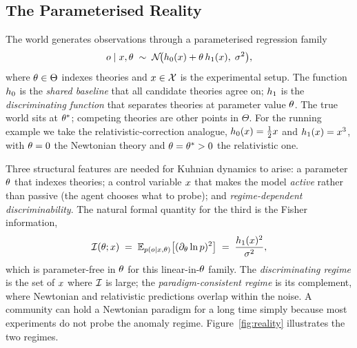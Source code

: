 \subsection{The Parameterised Reality}
\label{ssec:reality}

The world generates observations through a parameterised regression
family
\begin{equation}
o \mid x, \theta
\;\sim\;
\mathcal{N}\!\bigl(h_{0}(x) + \theta\,h_{1}(x),\; \sigma^{2}\bigr),
\label{eq:world}
\end{equation}
where $\theta \in \Theta$ indexes theories and $x \in \mathcal{X}$
is the experimental setup. The function $h_{0}$ is the \emph{shared
baseline} that all candidate theories agree on; $h_{1}$ is the
\emph{discriminating function} that separates theories at parameter
value $\theta$. The true world sits at $\theta^{*}$; competing
theories are other points in $\Theta$. For the running example we take
the relativistic-correction analogue, $h_{0}(x) = \tfrac{1}{2}x$
and $h_{1}(x) = x^{3}$, with $\theta = 0$ the Newtonian theory
and $\theta = \theta^{*} > 0$ the relativistic one.

Three structural features are needed for Kuhnian dynamics to arise: a
parameter $\theta$ that indexes theories; a control variable $x$
that makes the model \emph{active} rather than passive (the agent
chooses what to probe); and \emph{regime-dependent discriminability}.
The natural formal quantity for the third is the Fisher information,
\begin{equation}
\mathcal{I}(\theta; x)
\;=\;
\mathbb{E}_{p(o \mid x, \theta)}\!\left[(\partial_{\theta}\ln p)^{2}\right]
\;=\;
\frac{h_{1}(x)^{2}}{\sigma^{2}},
\label{eq:fisher}
\end{equation}
which is parameter-free in $\theta$ for this linear-in-$\theta$
family. The \emph{discriminating regime} is the set of $x$ where
$\mathcal{I}$ is large; the \emph{paradigm-consistent regime} is its
complement, where Newtonian and relativistic predictions overlap within
the noise. A community can hold a Newtonian paradigm for a long time
simply because most experiments do not probe the anomaly regime.
Figure~\ref{fig:reality} illustrates the two regimes.

